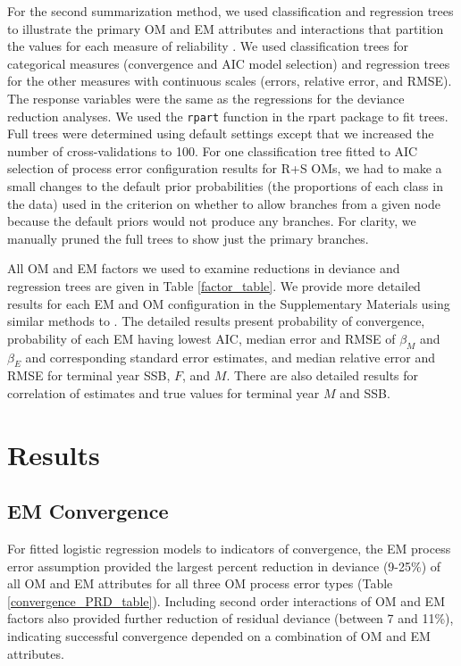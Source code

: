 \documentclass[
  12pt,
]{article}
\begin{document}
For the second summarization method, we used classification and regression trees \citep{breimanetal84} to illustrate the primary OM and EM attributes and interactions that partition the values for each measure of reliability \citep[e.g.,][]{gonzalezetal18, collieretal22}. We used classification trees for categorical measures (convergence and AIC model selection) and regression trees for the other measures with continuous scales (errors, relative error, and RMSE). The response variables were the same as the regressions for the deviance reduction analyses. We used the \verb|rpart| function in the rpart package \citep{rpart} to fit trees. Full trees were determined using default settings except that we increased the number of cross-validations to 100. For one classification tree fitted to AIC selection of process error configuration results for R+S OMs, we had to make a small changes to the default prior probabilities (the proportions of each class in the data) used in the criterion on whether to allow branches from a given node because the default priors would not produce any branches. For clarity, we manually pruned the full trees to show just the primary branches.

All OM and EM factors we used to examine reductions in deviance and regression trees are given in Table \ref{factor_table}. We provide more detailed results for each EM and OM configuration in the Supplementary Materials using similar methods to \citet{milleretal_inreview1}. The detailed results present probability of convergence, probability of each EM having lowest AIC, median error and RMSE of \(\beta_M\) and \(\beta_E\) and corresponding standard error estimates, and median relative error and RMSE for terminal year SSB, \(F\), and \(M\). There are also detailed results for correlation of estimates and true values for terminal year \(M\) and SSB.

\section*{Results}\label{results}

\subsection*{EM Convergence}\label{em-convergence-1}

For fitted logistic regression models to indicators of convergence, the EM process error assumption provided the largest percent reduction in deviance (9-25\%) of all OM and EM attributes for all three OM process error types (Table \ref{convergence_PRD_table}). Including second order interactions of OM and EM factors also provided further reduction of residual deviance (between 7 and 11\%), indicating successful convergence depended on a combination of OM and EM attributes.
\end{document}
